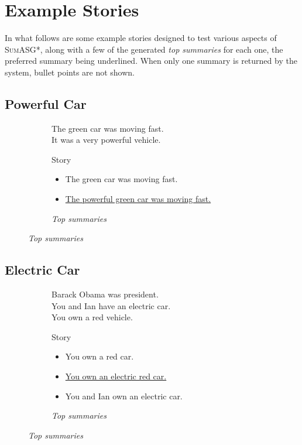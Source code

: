 \chapter{Example Stories}
\label{appendix:stories}

In what follows are some example stories designed to test various aspects of \textsc{SumASG*}, along with a few of the generated \textit{top summaries} for each one, the preferred summary being underlined. When only one summary is returned by the system, bullet points are not shown.

\section{Powerful Car}

\begin{figure}[H]
\begin{subfigure}{0.5\textwidth}
\begin{displayquote}
The green car was moving fast.\\
It was a very powerful vehicle.
\end{displayquote}
\caption{Story}
\end{subfigure}
\begin{subfigure}{0.5\textwidth}
\begin{itemize}[nolistsep]
\item The green car was moving fast.
\item \underline{The powerful green car was moving fast.}
\end{itemize}
\vspace{\topsep}
\caption{\textit{Top summaries}}
\end{subfigure}
\end{figure}

\section{Electric Car}

\begin{figure}[H]
\begin{subfigure}{0.52\textwidth}
\begin{displayquote}
Barack Obama was president.\\
You and Ian have an electric car.\\
You own a red vehicle.
\end{displayquote}
\caption{Story}
\end{subfigure}
\begin{subfigure}{0.48\textwidth}
\begin{itemize}[nolistsep]
\item You own a red car.
\item \ul{You own an electric red car.}
\item You and Ian own an electric car.
\end{itemize}
\vspace{\topsep}
\caption{\textit{Top summaries}}
\end{subfigure}
\end{figure}

